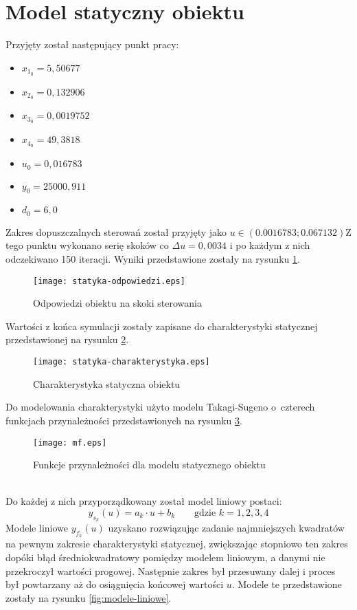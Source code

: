 \section{Model statyczny obiektu}
Przyjęty został następujący punkt pracy:
\begin{itemize}
	\item $x_{1_0} = 5,50677$
	\item $x_{2_0} = 0,132906$
	\item $x_{3_0} = 0,0019752$
	\item $x_{4_0} = 49,3818$
	\item $u_0 = 0,016783$
	\item $y_0 = 25000,911$
	\item $d_0 = 6,0$
\end{itemize}
Zakres dopuszczalnych sterowań został przyjęty jako $ u \in (0.0016783; 0.067132)$Z tego punktu wykonano serię skoków co $\Delta u = 0,0034$ i po każdym z nich odczekiwano 150 iteracji. Wyniki przedstawione zostały na rysunku \ref{fig:statyka-odpowiedzi}.
\begin{figure}[!h]
	\centering \texttt{[image: statyka-odpowiedzi.eps]}
	\caption{Odpowiedzi obiektu na skoki sterowania}
	\label{fig:statyka-odpowiedzi}
\end{figure}
Wartości z końca symulacji zostały zapisane do charakterystyki statycznej przedstawionej na rysunku \ref{fig:statyka-charakterystyka}.
\begin{figure}[!h]
	\centering \texttt{[image: statyka-charakterystyka.eps]}
	\caption{Charakterystyka statyczna obiektu}
	\label{fig:statyka-charakterystyka}
\end{figure}
Do modelowania charakterystyki użyto modelu Takagi-Sugeno o~czterech funkcjach przynależności przedstawionych na rysunku \ref{fig:mf}.
\begin{figure}[!h]
	\centering \texttt{[image: mf.eps]}
	\caption{Funkcje przynależności dla modelu statycznego obiektu}
	\label{fig:mf}
\end{figure}
\\Do każdej z nich przyporządkowany został model liniowy postaci:
\begin{equation}
y_{s_k}(u) = a_k\cdot u + b_k \qquad \textrm{gdzie } k = 1, 2, 3, 4
\end{equation}
Modele liniowe $y_{f_k}(u)$ uzyskano rozwiązując zadanie najmniejszych kwadratów na pewnym zakresie charakterystyki statycznej, zwiększając stopniowo ten zakres dopóki błąd średniokwadratowy pomiędzy modelem liniowym, a danymi nie przekroczył wartości progowej. Następnie zakres był przesuwany dalej i proces był powtarzany aż do osiągnięcia końcowej wartości $u$. Modele te przedstawione zostały na rysunku \ref{fig:modele-liniowe}.
